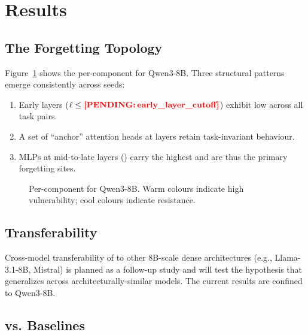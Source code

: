 \section{Results}
\label{sec:results}

\subsection{The Forgetting Topology}
\label{sec:results:topology}

Figure~\ref{fig:topology} shows the per-component \fvs{} for Qwen3-8B. Three structural patterns emerge consistently across seeds:
\begin{enumerate}
  \item Early layers ($\ell \le \pend{early_layer_cutoff}$) exhibit low \fvs{} across all task pairs.
  \item A set of ``anchor'' attention heads at layers  retain task-invariant behaviour.
  \item MLPs at mid-to-late layers () carry the highest \fvs{} and are thus the primary forgetting sites.
\end{enumerate}

\begin{figure}[t]
  \centering
  \caption{Per-component \fvs{} for Qwen3-8B. Warm colours indicate high vulnerability; cool colours indicate resistance.}
  \label{fig:topology}
\end{figure}

\subsection{\fvs{} Transferability}
\label{sec:results:transfer}

Cross-model transferability of \fvs{} to other 8B-scale dense architectures (e.g., Llama-3.1-8B, Mistral) is planned as a follow-up study and will test the hypothesis that \fvs{} generalizes across architecturally-similar models. The current results are confined to Qwen3-8B.

\subsection{\tglora{} vs. Baselines}
\label{sec:results:tglora}

